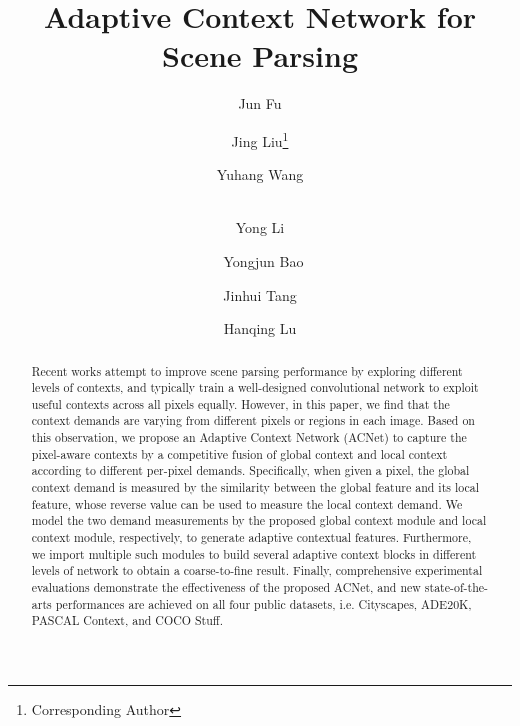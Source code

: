 \documentclass[10pt,twocolumn,letterpaper]{article}
\begin{document}
\title{Adaptive Context Network for Scene Parsing}
\author[${1,4}$ ]{
Jun Fu
}
\author[${1}$]{
\; Jing Liu\thanks{Corresponding Author}
}
\author[${1}$]{
\; Yuhang Wang  
}

\author[${2}$]{
\\ Yong Li 
}

\author[${2}$]{
\ Yongjun Bao
}
\author[${3}$]{
\;Jinhui Tang
}
\author[${1}$]{
\;Hanqing Lu
}

\renewcommand\Authsep{  } 
\renewcommand\Authands{  }

\maketitle
\thispagestyle{empty}
\begin{abstract}
   Recent works attempt to improve scene parsing performance by exploring different levels of contexts, and typically train a well-designed convolutional network to exploit useful contexts across all pixels equally. However, in this paper, we find that the context demands are varying from different pixels or regions in each image. Based on this observation, we propose an Adaptive Context Network (ACNet) to capture the pixel-aware contexts by a competitive fusion of global context and local context according to different per-pixel demands. Specifically, when given a pixel, the global context demand is measured by the similarity between the global feature and its local feature, whose reverse value can be used to measure the local context demand. We model  the two demand measurements by the proposed global context module and local context module, respectively, to generate adaptive contextual features. Furthermore, we  import multiple such modules to build several adaptive context blocks in  different levels of network to obtain a coarse-to-fine result.  Finally, comprehensive experimental evaluations demonstrate the effectiveness of the proposed ACNet, and new state-of-the-arts performances are achieved on all four public datasets, i.e. Cityscapes, ADE20K, PASCAL Context, and COCO Stuff.
\end{abstract}
\end{document}
